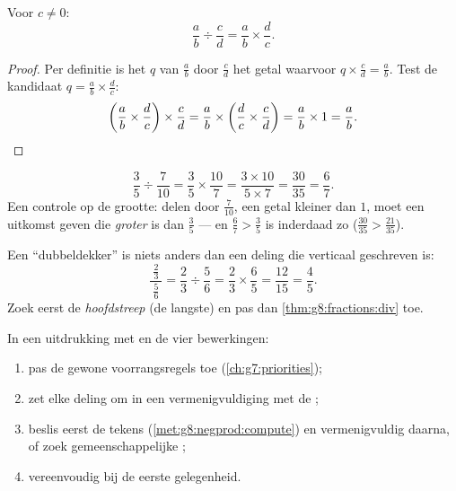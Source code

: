 \begin{theorem}\label{thm:g8:fractions:div}
Voor $c \neq 0$:
\[
\frac{a}{b} \div \frac{c}{d} = \frac{a}{b} \times \frac{d}{c} .
\]
\end{theorem}

\begin{proof}
Per definitie is het  $q$ van $\frac ab$ door $\frac cd$ het getal waarvoor
$q \times \frac cd = \frac ab$. Test de kandidaat $q = \frac ab \times \frac dc$:
\[
\left(\frac ab \times \frac dc\right) \times \frac cd
= \frac ab \times \left(\frac dc \times \frac cd\right)
= \frac ab \times 1 = \frac ab . \qedhere
\]
\end{proof}

\begin{example}\label{ex:g8:fractions:div}
\[
\frac{3}{5} \div \frac{7}{10}
= \frac{3}{5} \times \frac{10}{7}
= \frac{3 \times 10}{5 \times 7}
= \frac{30}{35} = \frac{6}{7}.
\]
Een controle op de grootte: delen door $\frac{7}{10}$, een getal kleiner dan $1$, moet
een uitkomst geven die \emph{groter} is dan $\frac35$ --- en $\frac67 > \frac35$ is
inderdaad zo ($\frac{30}{35} > \frac{21}{35}$).
\end{example}

\begin{example}\label{ex:g8:fractions:complex}
Een ``dubbeldekker'' is niets anders dan een deling die verticaal geschreven is:
\[
\frac{\ \frac{2}{3}\ }{\ \frac{5}{6}\ }
= \frac{2}{3} \div \frac{5}{6}
= \frac{2}{3} \times \frac{6}{5}
= \frac{12}{15} = \frac{4}{5}.
\]
Zoek eerst de \emph{hoofdstreep} (de langste) en pas dan
\cref{thm:g8:fractions:div} toe.
\end{example}

\begin{method}\label{met:g8:fractions:mixed}
In een uitdrukking met  en de vier bewerkingen:
\begin{enumerate}
  \item pas de gewone voorrangsregels toe (\cref{ch:g7:priorities});
  \item zet elke deling om in een vermenigvuldiging met de ;
  \item beslis eerst de tekens (\cref{met:g8:negprod:compute}) en vermenigvuldig
        daarna, of zoek gemeenschappelijke ;
  \item vereenvoudig bij de eerste gelegenheid.
\end{enumerate}
\end{method}

